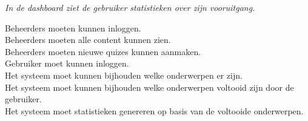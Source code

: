 \documentclass[]{report}
\begin{document}
\textit{In de dashboard ziet de gebruiker statistieken over zijn vooruitgang.}

Beheerders moeten kunnen inloggen. \\
Beheerders moeten alle content kunnen zien. \\
Beheerders moeten nieuwe quizes kunnen aanmaken. \\
Gebruiker moet kunnen inloggen. \\ 
Het systeem moet kunnen bijhouden welke onderwerpen er zijn. \\ 
Het systeem moet kunnen bijhouden welke onderwerpen voltooid zijn door de gebruiker. \\ 
Het systeem moet statistieken genereren op basis van de voltooide onderwerpen. \\
\end{document}
